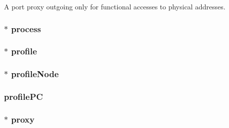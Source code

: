 \label{structThreadState_a1020d50e51f5a51af704e2a92c228f76}
A port proxy outgoing only for functional accesses to physical addresses. \hypertarget{structThreadState_a075e3da8f2570b13cecbbffca7e30d1a}{
\subsubsection[{process}]{$\ast$ {\bf process}}}
\label{structThreadState_a075e3da8f2570b13cecbbffca7e30d1a}
\hypertarget{structThreadState_a57684045e6580be82debaf2ed1d038ff}{
\subsubsection[{profile}]{$\ast$ {\bf profile}}}
\label{structThreadState_a57684045e6580be82debaf2ed1d038ff}
\hypertarget{structThreadState_a9e724ad49e865acc300eb316dcf2e9bd}{
\subsubsection[{profileNode}]{$\ast$ {\bf profileNode}}}
\label{structThreadState_a9e724ad49e865acc300eb316dcf2e9bd}
\hypertarget{structThreadState_a8d1675ee887ea4904e7b244eef19c922}{
\subsubsection[{profilePC}]{ {\bf profilePC}}}
\label{structThreadState_a8d1675ee887ea4904e7b244eef19c922}
\hypertarget{structThreadState_ac7d5f54aedf1b7a6679e114de0fe6fb4}{
\subsubsection[{proxy}]{$\ast$ {\bf proxy}}}
